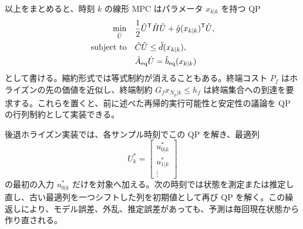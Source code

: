 以上をまとめると、時刻 $k$ の線形 MPC はパラメータ $x_{k|k}$ を持つ QP
\begin{align}
  \min_{\hat{U}}\quad &
  \frac{1}{2}\hat{U}^{\mathsf{T}} \hat{H}\hat{U}
  +\hat{g}(x_{k|k})^{\mathsf{T}} \hat{U},\\
  \text{subject to}\quad &
  \hat{C}\hat{U}\le\hat{d}(x_{k|k}),\\
  &\hat{A}_{\mathrm{eq}}\hat{U}=\hat{b}_{\mathrm{eq}}(x_{k|k})
\end{align}
として書ける。縮約形式では等式制約が消えることもある。終端コスト $P_f$ はホライズンの先の価値を近似し、終端制約 $G_fx_{N_p|k}\le h_f$ は終端集合への到達を要求する。これらを置くと、前に述べた再帰的実行可能性と安定性の議論を QP の行列制約として実装できる。

後退ホライズン実装では、各サンプル時刻でこの QP を解き、最適列
\begin{equation}
  U^*_k=
  \begin{bmatrix}
    u^*_{0|k}\\u^*_{1|k}\\\vdots
  \end{bmatrix}
\end{equation}
の最初の入力 $u^*_{0|k}$ だけを対象へ加える。次の時刻では状態を測定または推定し直し、古い最適列を一つシフトした列を初期値として再び QP を解く。この繰返しにより、モデル誤差、外乱、推定誤差があっても、予測は毎回現在状態から作り直される。

